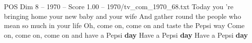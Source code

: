 \begin{textsample}{POS Dim 8 – 1970 – Score 1.00 – 1970/tv\_com\_1970\_68.txt}  \label{ex:f8_pos_088}
Today you 're bringing home your new baby and your wife And gather round the people who mean so much in your life Oh, come on, come on and taste the Pepsi way Come on, come on, come on and have a Pepsi \textbf{day} Have a Pepsi \textbf{day} Have a Pepsi \textbf{day}

\end{textsample}
